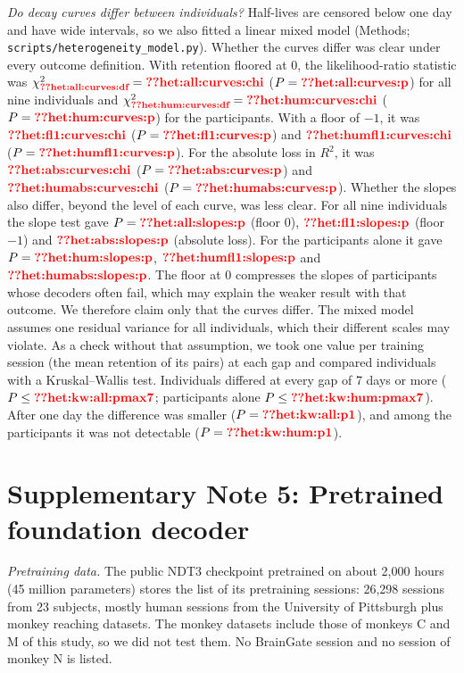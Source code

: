 \documentclass[pdflatex,sn-nature]{sn-jnl}
\begin{document}
\textit{Do decay curves differ between individuals?} Half-lives are censored below one day and have wide intervals,
so we also fitted a linear mixed model (Methods; \texttt{scripts/heterogeneity\_model.py}). Whether the curves differ
was clear under every outcome definition. With retention floored at 0, the likelihood-ratio statistic was
$\chi^2_{\val{het:all:curves:df}} = \val{het:all:curves:chi}$ ($P = \val{het:all:curves:p}$) for all nine individuals and
$\chi^2_{\val{het:hum:curves:df}} = \val{het:hum:curves:chi}$ ($P = \val{het:hum:curves:p}$) for the participants. With a
floor of $-1$, it was $\val{het:fl1:curves:chi}$ ($P = \val{het:fl1:curves:p}$) and $\val{het:humfl1:curves:chi}$
($P = \val{het:humfl1:curves:p}$). For the absolute loss in $R^2$, it was $\val{het:abs:curves:chi}$
($P = \val{het:abs:curves:p}$) and $\val{het:humabs:curves:chi}$ ($P = \val{het:humabs:curves:p}$). Whether the slopes
also differ, beyond the level of each curve, was less clear. For all nine individuals the slope test gave
$P = \val{het:all:slopes:p}$ (floor 0), $\val{het:fl1:slopes:p}$ (floor $-1$) and $\val{het:abs:slopes:p}$
(absolute loss). For the participants alone it gave $P = \val{het:hum:slopes:p}$, $\val{het:humfl1:slopes:p}$ and
$\val{het:humabs:slopes:p}$. The floor at 0 compresses the slopes of participants whose decoders often fail, which
may explain the weaker result with that outcome. We therefore claim only that the curves differ. The mixed model
assumes one residual variance for all individuals, which their different scales may violate. As a check without that
assumption, we took one value per training session (the mean retention of its pairs) at each gap and compared
individuals with a Kruskal--Wallis test. Individuals differed at every gap of 7 days or more ($P \le
\val{het:kw:all:pmax7}$; participants alone $P \le \val{het:kw:hum:pmax7}$). After one day the difference was smaller
($P = \val{het:kw:all:p1}$), and among the participants it was not detectable ($P = \val{het:kw:hum:p1}$).

\section*{Supplementary Note 5: Pretrained foundation decoder}

\textit{Pretraining data.} The public NDT3 checkpoint pretrained on about 2,000 hours (45 million parameters) stores the
list of its pretraining sessions: 26,298 sessions from 23 subjects, mostly human sessions from the University of Pittsburgh
plus monkey reaching datasets. The monkey datasets include those of monkeys C and M of this study, so we did not test them.
No BrainGate session and no session of monkey N is listed.
\end{document}

